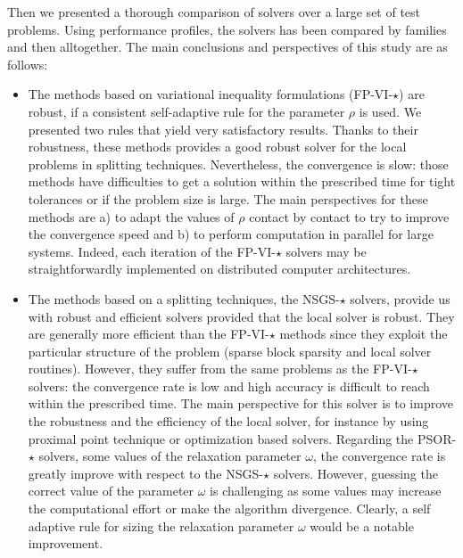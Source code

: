 Then we presented a thorough comparison of solvers over a large set of test problems. Using performance profiles, the solvers has been compared by families and then alltogether. The main conclusions and perspectives of this study are as follows:
\begin{itemize}
\item The methods based on variational inequality formulations ({\sf FP-VI-$\star$}) are robust, if a consistent self-adaptive rule for the parameter $\rho$ is used. We presented two rules that yield very satisfactory results. Thanks to their robustness, these methods provides a good robust solver for the local problems in splitting techniques. Nevertheless, the convergence is slow: those methods have difficulties to get a solution within the prescribed time for tight tolerances or if the problem size is large. The main perspectives for these methods are a) to adapt the values of $\rho$ contact by contact to try to improve the convergence speed and b) to perform computation in parallel for large systems. Indeed, each iteration of the {\sf FP-VI-$\star$} solvers may be straightforwardly implemented on distributed computer architectures.

\item The methods based on a splitting techniques, the {\sf NSGS-$\star$} solvers, provide us with robust and efficient solvers provided that the local solver is robust. They are generally more efficient than the {\sf FP-VI-$\star$} methods since they exploit the particular structure of the problem (sparse block sparsity and local solver routines). However, they suffer from the same problems as the  {\sf FP-VI-$\star$} solvers: the convergence rate is low and high accuracy is difficult to reach within the prescribed time. The main perspective for this solver is to improve the robustness and the efficiency of the local solver, for instance by using proximal point technique or optimization based solvers. Regarding the {\sf PSOR-$\star$} solvers, some values of the relaxation parameter $\omega$, the convergence rate is greatly improve with respect to the {\sf NSGS-$\star$} solvers. However, guessing the correct value of the parameter $\omega$ is challenging as some values may increase the computational effort or make the algorithm divergence. Clearly, a self adaptive rule for sizing the relaxation parameter $\omega$ would be a notable improvement.


\end{itemize}
